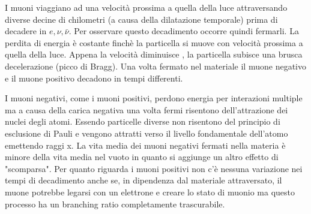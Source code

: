 I muoni viaggiano ad una velocità prossima a quella della luce attraversando diverse decine di chilometri (a causa della dilatazione temporale) prima di decadere in $e,\nu,\bar{\nu}$. Per osservare questo decadimento occorre quindi fermarli. La perdita di energia è costante finchè la particella si muove con velocità prossima a quella della luce. Appena la velocità diminuisce , la particella subisce una brusca decelerazione (picco di Bragg). Una volta fermato nel materiale il muone negativo e il muone positivo decadono in tempi differenti. 

I muoni negativi, come i muoni positivi, perdono energia per interazioni multiple ma a causa della carica negativa una volta fermi risentono dell'attrazione dei nuclei degli atomi. Essendo particelle diverse non risentono del principio di esclusione di Pauli e vengono attratti verso il livello fondamentale dell'atomo emettendo raggi x. La vita media dei muoni negativi fermati nella materia è minore della vita media nel vuoto in quanto si aggiunge un altro effetto di "scomparsa".
Per quanto riguarda i muoni positivi non c'è nessuna variazione nei tempi di decadimento anche se, in dipendenza dal materiale attraversato, il muone potrebbe legarsi con un elettrone e creare lo stato di muonio ma questo processo ha un branching ratio completamente trascurabile.
 